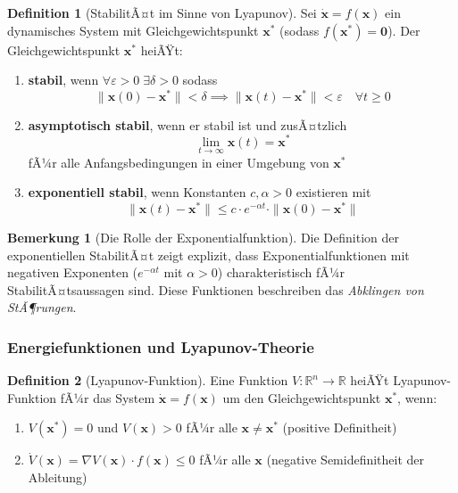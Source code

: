 ﻿\documentclass[a4paper,12pt]{scrreprt}
\theoremstyle{definition}
\newtheorem{definition}{Definition}[section]
\newtheorem{bemerkung}{Bemerkung}[section]
\begin{document}
\begin{definition}[StabilitÃ¤t im Sinne von Lyapunov]
	Sei $\dot{\mathbf{x}} = f(\mathbf{x})$ ein dynamisches System mit Gleichgewichtspunkt $\mathbf{x}^*$ (sodass $f(\mathbf{x}^*) = \mathbf{0}$). Der Gleichgewichtspunkt $\mathbf{x}^*$ heiÃŸt:
	\begin{enumerate}
		\item[-] \textbf{stabil}, wenn $\forall \varepsilon > 0 \; \exists \delta > 0$ sodass
		\begin{equation}
			\|\mathbf{x}(0) - \mathbf{x}^*\| < \delta \implies \|\mathbf{x}(t) - \mathbf{x}^*\| < \varepsilon \quad \forall t \geq 0
		\end{equation}
		
		\item[-] \textbf{asymptotisch stabil}, wenn er stabil ist und zusÃ¤tzlich
		\begin{equation}
			\lim_{t \to \infty} \mathbf{x}(t) = \mathbf{x}^* 
		\end{equation}
		fÃ¼r alle Anfangsbedingungen in einer Umgebung von $\mathbf{x}^*$
		
		\item[-] \textbf{exponentiell stabil}, wenn Konstanten $c, \alpha > 0$ existieren mit
		\begin{equation}
			\|\mathbf{x}(t) - \mathbf{x}^*\| \leq c \cdot e^{-\alpha t} \cdot \|\mathbf{x}(0) - \mathbf{x}^*\|
		\end{equation}
	\end{enumerate}
\end{definition}

\begin{bemerkung}[Die Rolle der Exponentialfunktion]
	Die Definition der exponentiellen StabilitÃ¤t zeigt explizit, dass Exponentialfunktionen mit negativen Exponenten ($e^{-\alpha t}$ mit $\alpha > 0$) charakteristisch fÃ¼r StabilitÃ¤tsaussagen sind. Diese Funktionen beschreiben das \textit{Abklingen von StÃ¶rungen}.
\end{bemerkung}

\subsubsection{Energiefunktionen und Lyapunov-Theorie}

\begin{definition}[Lyapunov-Funktion]
	Eine Funktion $V: \mathbb{R}^n \to \mathbb{R}$ heiÃŸt Lyapunov-Funktion fÃ¼r das System $\dot{\mathbf{x}} = f(\mathbf{x})$ um den Gleichgewichtspunkt $\mathbf{x}^*$, wenn:
	\begin{enumerate}
		\item[-] $V(\mathbf{x}^*) = 0$ und $V(\mathbf{x}) > 0$ fÃ¼r alle $\mathbf{x} \neq \mathbf{x}^*$ (positive Definitheit)
		\item[-] $\dot{V}(\mathbf{x}) = \nabla V(\mathbf{x}) \cdot f(\mathbf{x}) \leq 0$ fÃ¼r alle $\mathbf{x}$ (negative Semidefinitheit der Ableitung)
	\end{enumerate}
\end{definition}
\end{document}
